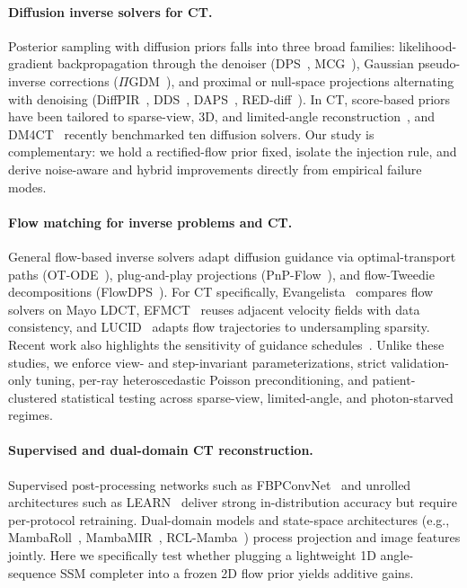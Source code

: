 \documentclass[11pt]{article}
\begin{document}
\paragraph{Diffusion inverse solvers for CT.}
Posterior sampling with diffusion priors falls into three broad families: likelihood-gradient backpropagation through the denoiser (DPS~\cite{chung2023dps}, MCG~\cite{chung2022mcg}), Gaussian pseudo-inverse corrections ($\Pi$GDM~\cite{song2023pigdm}), and proximal or null-space projections alternating with denoising (DiffPIR~\cite{zhu2023diffpir}, DDS~\cite{chung2024dds}, DAPS~\cite{zhang2025daps}, RED-diff~\cite{mardani2024reddiff}). In CT, score-based priors have been tailored to sparse-view, 3D, and limited-angle reconstruction~\cite{song2022scoremed,chung2023diffusionmbir,song2024diffusionblend,liu2023dolce}, and DM4CT~\cite{shi2026dm4ct} recently benchmarked ten diffusion solvers. Our study is complementary: we hold a rectified-flow prior fixed, isolate the injection rule, and derive noise-aware and hybrid improvements directly from empirical failure modes.

\paragraph{Flow matching for inverse problems and CT.}
General flow-based inverse solvers adapt diffusion guidance via optimal-transport paths (OT-ODE~\cite{pokle2024otode}), plug-and-play projections (PnP-Flow~\cite{martin2025pnpflow}), and flow-Tweedie decompositions (FlowDPS~\cite{kim2025flowdps}). For CT specifically, Evangelista~\cite{evangelista2026pgfm} compares flow solvers on Mayo LDCT, EFMCT~\cite{eFMCT2026} reuses adjacent velocity fields with data consistency, and LUCID~\cite{lucid2026} adapts flow trajectories to undersampling sparsity. Recent work also highlights the sensitivity of guidance schedules~\cite{moroy2026guidanceweights,barthakur2026leegs,bang2026trips}. Unlike these studies, we enforce view- and step-invariant parameterizations, strict validation-only tuning, per-ray heteroscedastic Poisson preconditioning, and patient-clustered statistical testing across sparse-view, limited-angle, and photon-starved regimes.

\paragraph{Supervised and dual-domain CT reconstruction.}
Supervised post-processing networks such as FBPConvNet~\cite{jin2017fbpconvnet} and unrolled architectures such as LEARN~\cite{chen2018learn} deliver strong in-distribution accuracy but require per-protocol retraining. Dual-domain models and state-space architectures (e.g., MambaRoll~\cite{kabas2024mambaroll}, MambaMIR~\cite{huang2024mambamir}, RCL-Mamba~\cite{duan2026rclmamba}) process projection and image features jointly. Here we specifically test whether plugging a lightweight 1D angle-sequence SSM completer into a frozen 2D flow prior yields additive gains.
\end{document}
